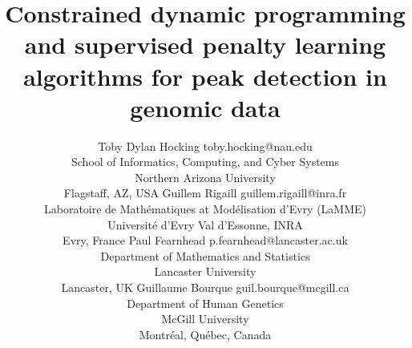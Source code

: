 \documentclass[twoside,11pt]{article}
\begin{document}
\title{Constrained dynamic programming and supervised
penalty learning algorithms for 
peak detection in genomic data}

\author{%
  \name Toby Dylan Hocking \email toby.hocking@nau.edu \\
  \addr School of Informatics, Computing, and Cyber Systems\\
  Northern Arizona University\\
  Flagstaff, AZ, USA
  \AND
  \name Guillem Rigaill \email guillem.rigaill@inra.fr \\
  \addr Laboratoire de Math\'ematiques at Mod\'elisation d'Evry (LaMME)\\
  Universit\'e d'Evry Val d'Essonne, INRA\\
  Evry, France
  \AND
  \name Paul Fearnhead \email p.fearnhead@lancaster.ac.uk \\
  \addr Department of Mathematics and Statistics\\
  Lancaster University\\
  Lancaster, UK
  \AND
  \name Guillaume Bourque \email guil.bourque@mcgill.ca\\
  \addr Department of Human Genetics\\
  McGill University\\
  Montr\'eal, Qu\'ebec, Canada}


\maketitle
\end{document}
